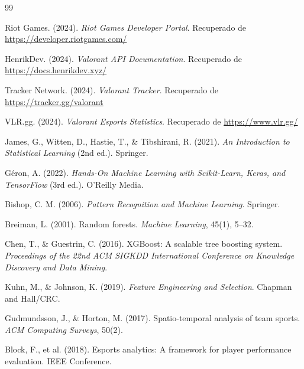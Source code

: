 \documentclass{ULBreport} %
\begin{document}
\begin{thebibliography}{99}

    Riot Games. (2024).
    \textit{Riot Games Developer Portal}. Recuperado de \url{https://developer.riotgames.com/}

    HenrikDev. (2024).
    \textit{Valorant API Documentation}. Recuperado de \url{https://docs.henrikdev.xyz/}

    Tracker Network. (2024).
    \textit{Valorant Tracker}. Recuperado de \url{https://tracker.gg/valorant}

    VLR.gg. (2024).
    \textit{Valorant Esports Statistics}. Recuperado de \url{https://www.vlr.gg/}

    James, G., Witten, D., Hastie, T., \& Tibshirani, R. (2021).
    \textit{An Introduction to Statistical Learning} (2nd ed.). Springer.

    Géron, A. (2022).
    \textit{Hands-On Machine Learning with Scikit-Learn, Keras, and TensorFlow} (3rd ed.). O'Reilly Media.

    Bishop, C. M. (2006).
    \textit{Pattern Recognition and Machine Learning}. Springer.

    Breiman, L. (2001). Random forests.
    \textit{Machine Learning}, 45(1), 5–32.

    Chen, T., \& Guestrin, C. (2016). XGBoost: A scalable tree boosting system.
    \textit{Proceedings of the 22nd ACM SIGKDD International Conference on Knowledge Discovery and Data Mining}.

    Kuhn, M., \& Johnson, K. (2019).
    \textit{Feature Engineering and Selection}. Chapman and Hall/CRC.

    Gudmundsson, J., \& Horton, M. (2017). Spatio-temporal analysis of team sports.
    \textit{ACM Computing Surveys}, 50(2).

    Block, F., et al. (2018). Esports analytics: A framework for player performance evaluation. IEEE Conference.

\end{thebibliography}
\endgroup
\end{document}
